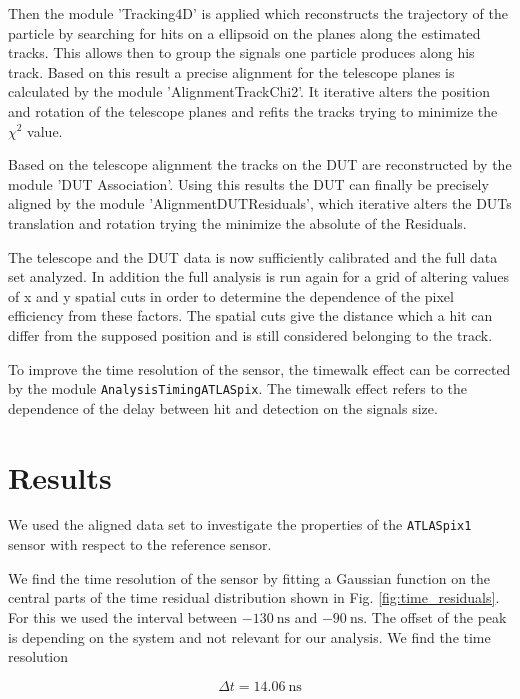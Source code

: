 \documentclass[twocolumn,DIV=14,a4paper,biblatex, 10pt]{scrartcl}
\newcommand{\atlaspix}{\texttt{ATLASpix1}\xspace}
\begin{document}
Then the module 'Tracking4D' is applied which reconstructs the trajectory of the particle by searching for hits on a ellipsoid on the planes along the estimated tracks. This allows then to group the signals one particle produces along his track. Based on this result a precise alignment for the telescope planes is calculated by the module 'AlignmentTrackChi2'. It iterative alters the position and rotation of the telescope planes and refits the tracks trying to minimize the $\chi^2$ value.

Based on the telescope alignment the tracks on the DUT are reconstructed by the module 'DUT Association'. Using this results the DUT can finally be precisely aligned by the module 'AlignmentDUTResiduals', which iterative alters the DUTs translation and rotation trying the minimize the absolute of the Residuals.

The telescope and the DUT data is now sufficiently calibrated and the full data set analyzed. In addition the full analysis is run again for a grid of altering values of x and y spatial cuts in order to determine the dependence of the pixel efficiency from these factors. The spatial cuts give the distance which a hit can differ from the supposed position and is still considered belonging to the track.

To improve the time resolution of the sensor, the timewalk effect can be corrected by the module \texttt{AnalysisTimingATLASpix}. The timewalk effect refers to the dependence of the delay between hit and detection on the signals size. 

\section{Results}
We used the aligned data set to investigate the properties of the  \atlaspix sensor with respect to the reference sensor. 

We find the time resolution of the sensor by fitting a Gaussian function on the central parts of the time residual distribution shown in Fig. \ref{fig:time_residuals}. For this we used the interval between $\SI{-130}{\nano\second}$ and $\SI{-90}{\nano\second}$. The offset of the peak is depending on the system and not relevant for our analysis. We find the time resolution

\begin{equation}
  \Delta t = \SI{14.06}{\nano\second}
\end{equation}
\end{document}
